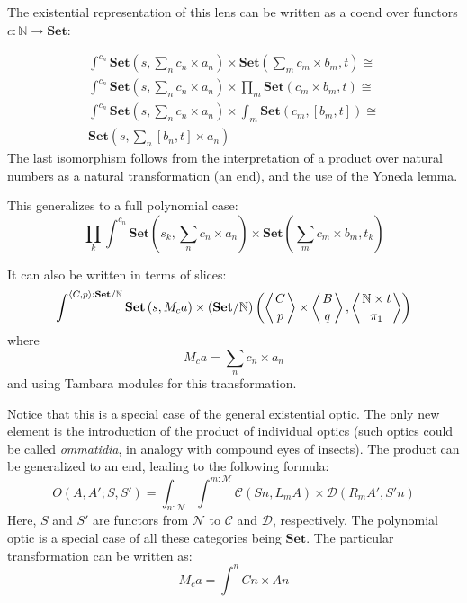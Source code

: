 \documentclass[11pt]{amsart}
\begin{document}
 
 The existential representation of this lens can be written as a coend over functors $c \colon \mathbb{N} \to \mathbf{Set}$:
 
\begin{align*}
\int^{c_n}  \mathbf{Set} (s, \sum_n c_n \times a_n) \times  \mathbf{Set} (\sum_m c_m \times b_m, t) \cong
\\
\int^{c_n}  \mathbf{Set} (s, \sum_n c_n \times a_n) \times  \prod_m \mathbf{Set} ( c_m \times b_m, t) \cong
\\
\int^{c_n}  \mathbf{Set} (s, \sum_n c_n \times a_n) \times  \int_m \mathbf{Set} ( c_m, [b_m, t]) \cong
\\ 
\mathbf{Set} (s, \sum_n [b_n, t] \times a_n)
\end{align*}
The last isomorphism follows from the interpretation of a product over natural numbers as a natural transformation (an end), and the use of the Yoneda lemma.

This generalizes to a full polynomial case:
\[ \prod_k \int^{c_n}  \mathbf{Set} (s_k, \sum_n c_n \times a_n) \times  \mathbf{Set} (\sum_m c_m \times b_m, t_k) \]


It can also be written in terms of slices:
\[ \int^{\langle C, p \rangle : \mathbf{Set}/\mathbb{N}} \mathbf{Set} 
\left(s,  M_c a \right)  
  \times (\mathbf{Set}/\mathbb{N})\left( \left \langle {C \atop p} \right \rangle 
  \times \left \langle {B \atop q} \right \rangle, \left \langle {\mathbb{N} \times t \atop \pi_1} \right \rangle \right) \]
 where 
 \[ M_c a = \sum_n c_n \times a_n \]
and using Tambara modules for this transformation.

Notice that this is a special case of the general existential optic. The only new element is the introduction of the product of individual optics (such optics could be called \emph{ommatidia}, in analogy with compound eyes of insects). The product can be generalized to an end, leading to the following formula:
\[ O(A, A'; S, S') = \int_{n \colon \mathcal{N}} \int^{m \colon \mathcal{M}} \mathcal{C}( S n, L_m A) \times \mathcal{D}(R_m A', S' n) \]
Here, $S$ and $S'$ are functors from $\mathcal{N}$ to $\mathcal{C}$ and $\mathcal{D}$, respectively. The polynomial optic is a special case of all these categories being $\mathbf{Set}$. The particular transformation can be written as:
\[ M_c a = \int^n C n \times A n \]
 
\end{document}
